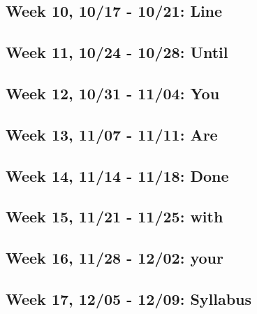 \documentclass[11pt,]{article}
\begin{document}
\subsection{Week 10, 10/17 - 10/21:
Line}\label{week-10-1017---1021-line}

\subsection{Week 11, 10/24 - 10/28:
Until}\label{week-11-1024---1028-until}

\subsection{Week 12, 10/31 - 11/04: You}\label{week-12-1031---1104-you}

\subsection{Week 13, 11/07 - 11/11: Are}\label{week-13-1107---1111-are}

\subsection{Week 14, 11/14 - 11/18:
Done}\label{week-14-1114---1118-done}

\subsection{Week 15, 11/21 - 11/25:
with}\label{week-15-1121---1125-with}

\subsection{Week 16, 11/28 - 12/02:
your}\label{week-16-1128---1202-your}

\subsection{Week 17, 12/05 - 12/09:
Syllabus}\label{week-17-1205---1209-syllabus}
\end{document}
